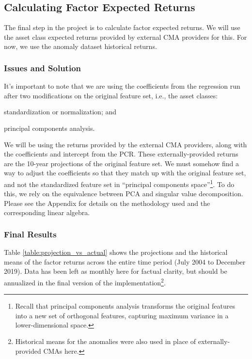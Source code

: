 \documentclass{ledger}
\begin{document}
\subsection{Calculating Factor Expected Returns}
The final step in the project is to calculate factor expected returns. We will use the asset class expected returns provided by external CMA providers for this. For now, we use the anomaly dataset historical returns. \\

\subsubsection{Issues and Solution} 
It's important to note that we are using the coefficients from the regression run after two modifications on the original feature set, i.e., the asset classes: \begin{inparaenum}[(i)] \item standardization or normalization; and \item principal components analysis.\end{inparaenum}We will be using the returns provided by the external CMA providers, along with the coefficients and intercept from the PCR. These externally-provided returns are the 10-year projections of the original feature set. We must somehow find a way to adjust the coefficients so that they match up with the original feature set, and not the standardized feature set in ``principal components space''\footnote{Recall that principal components analysis transforms the original features into a new set of orthogonal features, capturing maximum variance in a lower-dimensional space.}. To do this, we rely on the equivalence between PCA and singular value decomposition. Please see the Appendix for details on the methodology used and the corresponding linear algebra. \\

\subsubsection{Final Results}
Table \ref{table:projection_vs_actual} shows the projections and the historical means of the factor returns across the entire time period (July 2004 to December 2019). Data has been left as monthly here for factual clarity, but should be annualized in the final version of the implementation\footnote{Historical means for the anomalies were also used in place of externally-provided CMAs here.}. \\
\end{document}
